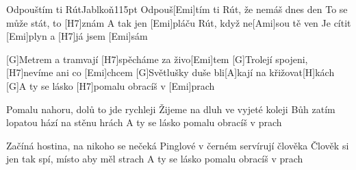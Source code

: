 \begin{song}{Odpouštím ti Rút}{Jablkoň}{115pt}
\chorus%
Odpouš[Emi]tím ti Rút, že nemáš dnes den
To se může stát, to [H7]znám
A tak jen [Emi]pláču Rút, když ne[Ami]sou tě ven
Je cítit [Emi]plyn a [H7]já jsem [Emi]sám

%
[G]Metrem a tramvají [H7]spěcháme za živo[Emi]tem
[G]Trolejí spojeni, [H7]nevíme ani co [Emi]chcem
[G]Světlušky duše bli[A]kají na křižovat[H]kách
\rl{}[G]A ty se lásko [H7]pomalu obracíš v [Emi]prach\rr{}
\repchor

%
Pomalu nahoru, dolů to jde rychleji
Žijeme na dluh ve vyjeté koleji
Bůh zatím lopatou hází na stěnu hrách
\rl{}A ty se lásko pomalu obracíš v prach\rr{}
\repchor

%
Začíná hostina, na nikoho se nečeká
Pinglové v černém servírují člověka
Člověk si jen tak spí, místo aby měl strach
\rl{}A ty se lásko pomalu obracíš v prach
\end{song}
